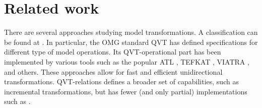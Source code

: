 \documentclass{llncs}
\begin{document}
\section{Related work}
\label{sec:rfwork}
%
There are several approaches studying model transformations. A classification can be found at
\cite{czarnecki}. In particular, the OMG standard QVT \cite{QVT} has defined specifications for different type of model operations. Its QVT-operational part has been implemented by various tools such as the popular ATL \cite{JouaultK05}, TEFKAT \cite{tefkat}, VIATRA \cite{viatra}, and others. These approaches allow for fast and efficient unidirectional transformations. QVT-relations defines a broader set of capabilities, such as incremental transformations, but has fewer (and only partial) implementations such as \cite{Medini}.\\
\end{document}
